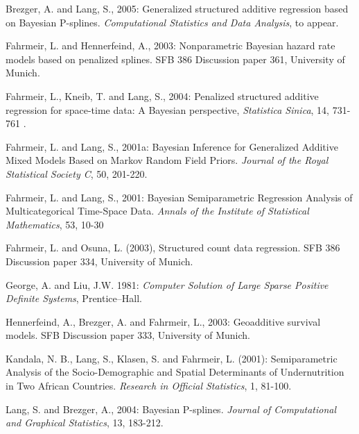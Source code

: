 \documentclass{article}
\begin{document}
\begin{thebibliography}{99}
 Brezger, A. and Lang,
S., 2005: Generalized structured additive regression based on
Bayesian P-splines. {\it Computational Statistics and Data
Analysis}, to appear.

 Fahrmeir,
L. and Hennerfeind, A., 2003: Nonparametric Bayesian hazard rate
models based on penalized splines. SFB 386 Discussion paper 361,
University of Munich.

 Fahrmeir, L., Kneib,
T. and Lang, S., 2004: Penalized structured additive regression for
space-time data: A Bayesian perspective, {\it Statistica Sinica},
14, 731-761 .

 Fahrmeir, L. and
Lang, S., 2001a: Bayesian Inference for Generalized Additive Mixed
Models Based on Markov Random Field Priors. {\it Journal of the
Royal Statistical Society C}, 50, 201-220.

 Fahrmeir, L. and
Lang, S., 2001: Bayesian Semiparametric Regression Analysis of
Multicategorical Time-Space Data. {\it Annals of the Institute of
Statistical Mathematics}, 53, 10-30

 Fahrmeir, L. and
Osuna, L. (2003), Structured count data regression. SFB 386
Discussion paper 334, University of Munich.

 George, A. and Liu,
J.W. 1981: {\it Computer Solution of Large Sparse Positive
Definite Systems}, Prentice--Hall.

 Hennerfeind, A.,
Brezger, A. and Fahrmeir, L., 2003: Geoadditive survival models.
SFB Discussion paper 333, University of Munich.

 Kandala, N. B., Lang,
S., Klasen, S. and Fahrmeir, L. (2001): Semiparametric Analysis of
the Socio-Demographic and Spatial Determinants of Undernutrition
in Two African Countries. {\it Research in Official Statistics},
1, 81-100.

 Lang, S. and Brezger,
A., 2004: Bayesian P-splines. {\it Journal of Computational and
Graphical Statistics}, 13, 183-212.

\end{thebibliography}
\end{document}
